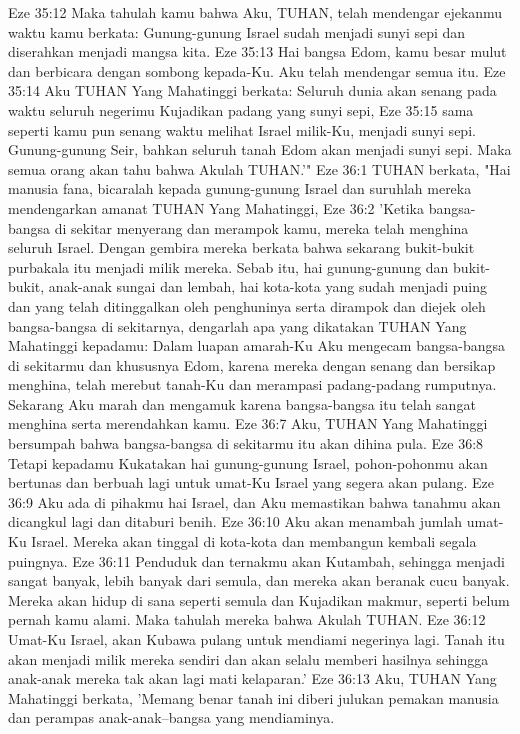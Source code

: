 Eze 35:12  Maka tahulah kamu bahwa Aku, TUHAN, telah mendengar ejekanmu waktu kamu berkata: Gunung-gunung Israel sudah menjadi sunyi sepi dan diserahkan menjadi mangsa kita.
Eze 35:13  Hai bangsa Edom, kamu besar mulut dan berbicara dengan sombong kepada-Ku. Aku telah mendengar semua itu.
Eze 35:14  Aku TUHAN Yang Mahatinggi berkata: Seluruh dunia akan senang pada waktu seluruh negerimu Kujadikan padang yang sunyi sepi,
Eze 35:15  sama seperti kamu pun senang waktu melihat Israel milik-Ku, menjadi sunyi sepi. Gunung-gunung Seir, bahkan seluruh tanah Edom akan menjadi sunyi sepi. Maka semua orang akan tahu bahwa Akulah TUHAN.'"
Eze 36:1  TUHAN berkata, "Hai manusia fana, bicaralah kepada gunung-gunung Israel dan suruhlah mereka mendengarkan amanat TUHAN Yang Mahatinggi,
Eze 36:2  'Ketika bangsa-bangsa di sekitar menyerang dan merampok kamu, mereka telah menghina seluruh Israel. Dengan gembira mereka berkata bahwa sekarang bukit-bukit purbakala itu menjadi milik mereka. Sebab itu, hai gunung-gunung dan bukit-bukit, anak-anak sungai dan lembah, hai kota-kota yang sudah menjadi puing dan yang telah ditinggalkan oleh penghuninya serta dirampok dan diejek oleh bangsa-bangsa di sekitarnya, dengarlah apa yang dikatakan TUHAN Yang Mahatinggi kepadamu: Dalam luapan amarah-Ku Aku mengecam bangsa-bangsa di sekitarmu dan khususnya Edom, karena mereka dengan senang dan bersikap menghina, telah merebut tanah-Ku dan merampasi padang-padang rumputnya. Sekarang Aku marah dan mengamuk karena bangsa-bangsa itu telah sangat menghina serta merendahkan kamu.
Eze 36:7  Aku, TUHAN Yang Mahatinggi bersumpah bahwa bangsa-bangsa di sekitarmu itu akan dihina pula.
Eze 36:8  Tetapi kepadamu Kukatakan hai gunung-gunung Israel, pohon-pohonmu akan bertunas dan berbuah lagi untuk umat-Ku Israel yang segera akan pulang.
Eze 36:9  Aku ada di pihakmu hai Israel, dan Aku memastikan bahwa tanahmu akan dicangkul lagi dan ditaburi benih.
Eze 36:10  Aku akan menambah jumlah umat-Ku Israel. Mereka akan tinggal di kota-kota dan membangun kembali segala puingnya.
Eze 36:11  Penduduk dan ternakmu akan Kutambah, sehingga menjadi sangat banyak, lebih banyak dari semula, dan mereka akan beranak cucu banyak. Mereka akan hidup di sana seperti semula dan Kujadikan makmur, seperti belum pernah kamu alami. Maka tahulah mereka bahwa Akulah TUHAN.
Eze 36:12  Umat-Ku Israel, akan Kubawa pulang untuk mendiami negerinya lagi. Tanah itu akan menjadi milik mereka sendiri dan akan selalu memberi hasilnya sehingga anak-anak mereka tak akan lagi mati kelaparan.'
Eze 36:13  Aku, TUHAN Yang Mahatinggi berkata, 'Memang benar tanah ini diberi julukan pemakan manusia dan perampas anak-anak--bangsa yang mendiaminya.
